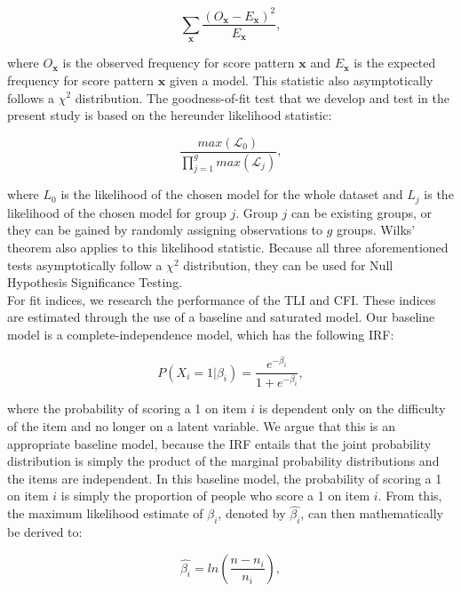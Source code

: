 \documentclass[Royal,sageapa,times,doublespace]{sagej}
\begin{document}
\begin{equation}
\sum_{\boldsymbol{x}} \frac{(O_{\boldsymbol{x}} - E_{\boldsymbol{x}})^2}{E_{\boldsymbol{x}}},
\end{equation}

where $O_{\boldsymbol{x}}$ is the observed frequency for score pattern $\boldsymbol{x}$ and $E_{\boldsymbol{x}}$ is the expected frequency for score pattern $\boldsymbol{x}$ given a model. This statistic also asymptotically follows a $\chi^2$ distribution. The goodness-of-fit test that we develop and test in the present study is based on the hereunder likelihood statistic: 

\begin{equation}
\frac{max(\mathcal{L}_0)}{\prod_{j = 1}^g max(\mathcal{L}_j)},
\end{equation}
 
where $L_0$ is the likelihood of the chosen model for the whole dataset and $L_j$ is the likelihood of the chosen model for group $j$. Group $j$ can be existing groups, or they can be gained by randomly assigning observations to $g$ groups. Wilks' theorem also applies to this likelihood statistic. Because all three aforementioned tests asymptotically follow a $\chi^2$ distribution, they can be used for Null Hypothesis Significance Testing. \\
\indent For fit indices, we research the performance of the TLI and CFI. These indices are estimated through the use of a baseline and saturated model. Our baseline model is a complete-independence model, which has the following IRF:

\begin{equation}
P(X_i = 1 | \beta_{i}) = \frac{e^{- \beta_{i}}}{1 + e^{- \beta_{i}}},
\end{equation}

where the probability of scoring a 1 on item $i$ is dependent only on the difficulty of the item and no longer on a latent variable. We argue that this is an appropriate baseline model, because the IRF entails that the joint probability distribution is simply the product of the marginal probability distributions and the items are independent. In this baseline model, the probability of scoring a 1 on item $i$ is simply the proportion of people who score a 1 on item $i$. From this, the maximum likelihood estimate of $\beta_{i}$, denoted by $\hat{\beta_{i}}$, can then mathematically be derived to:


\begin{equation*}
\hat{\beta_{i}} = ln(\frac{n - n_i}{n_i}), 
\end{equation*}
\end{document}

